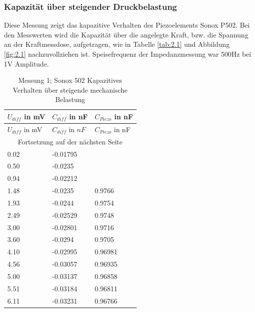 \documentclass[12pt]{scrreprt} %
\begin{document}
\subsubsection{Kapazität über steigender Druckbelastung}
Diese Messung zeigt das kapazitive Verhalten des Piezoelements Sonox P502. Bei den Messwerten wird die Kapazität über die angelegte Kraft, bzw. die Spannung an der Kraftmessdose, aufgetragen, wie in Tabelle \vref{tab:2.1} und Abbildung \vref{fig:2.1} nachzuvollziehen ist. Speisefrequenz der Impedanzmessung war 500Hz bei 1V Amplitude.
\setlongtables
\begin{longtable}{| l | l | l |}
\caption[Messung 1; Sonox 502 Kapazitives Verhalten]{Messung 1; Sonox 502 Kapazitives Verhalten über steigende mechanische Belastung}\\
\hline
$U_{diff}$ in mV&$C_{diff}$ in nF&$C_{Piezo}$ in nF\\
\hline
\endfirsthead
\hline
$U_{diff}$ in mV&$C_{diff}$ in $nF$&$C_{Piezo}$ in nF\\
\hline
\endhead
\hline
\multicolumn{3}{|c|}{Fortsetzung auf der nächsten Seite}\\
\hline
\endfoot
\hline \hline
\endlastfoot
\hline
\label{tab:2.1}%
0.02&-0.01795&\\
0.50&-0.0235&\\
0.94&-0.02212&\\
1.48&-0.0235&0.9766\\
1.93&-0.0244&0.9754\\
2.49&-0.02529&0.9748\\
3.00&-0.02801&0.9716\\
3.60&-0.0294&0.9705\\
4.10&-0.02995&0.96981\\
4.56&-0.03057&0.96935\\
5.00&-0.03137&0.96858\\
5.51&-0.03184&0.96811\\
6.11&-0.03231&0.96766\\
\end{longtable}
\end{document}
